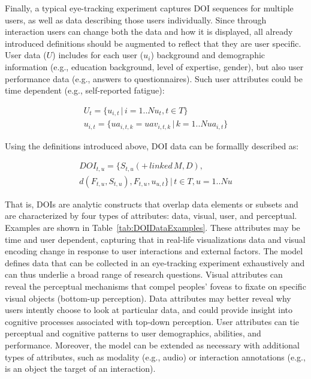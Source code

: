 Finally, a typical eye-tracking experiment captures DOI sequences for multiple users, as well as data describing those users individually. Since through interaction users can change both the data and how it is displayed, all already introduced definitions should be augmented to reflect that they are user specific. User data ($U$) includes for each user ($u_i$) background and demographic information (e.g., education background, level of expertise, gender), but also user performance data (e.g., answers to questionnaires). Such user attributes could be time dependent (e.g., self-reported fatigue):

\vspace{-5mm}
\begin{equation*}
\begin{split}
U_t = \{u_{i,t} \,|\, i=1..N\!u_t, t \in T\} \\
u_{i,t} = \{ua_{i,t,k} = uav_{i,t,k} \,|\, k=1..N\!ua_{i,t}\}
\end{split}
\end{equation*}

Using the definitions introduced above, DOI data can be formallly described as: 

\vspace{-5mm}
\begin{multline*}
DOI_{t,u} = \{S_{t,u} (+\,linked\, M, D), \\ d(F_{t,u}, S_{t,u}), F_{t,u}, u_{u,t}\} \,|\,t \in T, u = 1..N\!u
\end{multline*}

That is, DOIs are analytic constructs that overlap data elements or subsets and are characterized by four types of attributes: data, visual, user, and perceptual. Examples are shown in Table~\ref{tab:DOIDataExamples}. 
These attributes may be time and user dependent, capturing that in real-life visualizations data and visual encoding change in response to user interactions and external factors.  The model defines data that can be collected in an eye-tracking experiment exhaustively and can thus underlie a broad range of research questions. Visual attributes can reveal the perceptual mechanisms that compel peoples' foveas to fixate on specific visual objects (bottom-up perception). Data attributes may better reveal why users intently choose to look at particular data, and could provide insight into cognitive processes associated with top-down perception. User attributes can tie perceptual and cognitive patterns to user demographics, abilities, and performance. Moreover, the model can be extended as necessary with additional types of attributes, such as modality (e.g., audio) or interaction annotations (e.g., is an object the target of an interaction).

